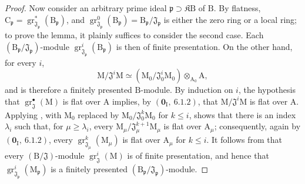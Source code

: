 \begin{proof}
Now consider an arbitrary prime ideal $\mathfrak{p}\supset\mathfrak K\mathrm{B}$ of $\mathrm{B}$. By flatness, $\mathrm{C}_\mathfrak{p}
=\operatorname{gr}^*_{\mathfrak{J}_\mathfrak{p}}(\mathrm{B}_\mathfrak{p})$,
and $\operatorname{gr}^0_{\mathfrak{J}_\mathfrak{p}}(\mathrm{B}_\mathfrak{p})=\mathrm{B}_\mathfrak{p}/\mathfrak{J}_\mathfrak{p}$ is either the zero ring or a local ring; to prove the lemma, it plainly suffices to consider the second case. Each $(\mathrm{B}_\mathfrak{p}/\mathfrak{J}_\mathfrak{p})$-module $\operatorname{gr}^i_{\mathfrak{J}_\mathfrak{p}}(\mathrm{B}_\mathfrak{p})$ is then of finite presentation. On the other hand, for every $i$,
\[
  \mathrm{M}/\mathfrak{J}^i\mathrm{M}
  \simeq
  (\mathrm{M}_0/\mathfrak{J}_0^i\mathrm{M}_0)
  \otimes_{\mathrm{A}_0}\mathrm{A},
\]
and is therefore a finitely presented $\mathrm{B}$-module. By induction on $i$, the hypothesis that $\operatorname{gr}^\bullet_\mathfrak{J}(\mathrm{M})$ is flat over $\mathrm{A}$ implies, by $(\mathbf{0}_\mathrm{I},~6.1.2)$, that $\mathrm{M}/\mathfrak{J}^i\mathrm{M}$ is flat over $\mathrm{A}$. Applying , with $\mathrm{M}_0$ replaced by $\mathrm{M}_0/\mathfrak{J}_0^k\mathrm{M}_0$ for $k\leqslant i$, shows that there is an index $\lambda_i$ such that, for $\mu\geqslant\lambda_i$, every $\mathrm{M}_\mu/\mathfrak{J}_\mu^{k+1}\mathrm{M}_\mu$ is flat over $\mathrm{A}_\mu$; consequently, again by $(\mathbf{0}_\mathrm{I},~6.1.2)$, every $\operatorname{gr}^k_{\mathfrak{J}_\mu}(\mathrm{M}_\mu)$ is flat over $\mathrm{A}_\mu$ for $k\leqslant i$. It follows from  that every $(\mathrm{B}/\mathfrak{J})$-module $\operatorname{gr}^i_\mathfrak{J}(\mathrm{M})$ is of finite presentation, and hence that $\operatorname{gr}^i_{\mathfrak{J}_\mathfrak{p}}(\mathrm{M}_\mathfrak{p})$ is a finitely presented $(\mathrm{B}_\mathfrak{p}/\mathfrak{J}_\mathfrak{p})$-module.


\end{proof}
